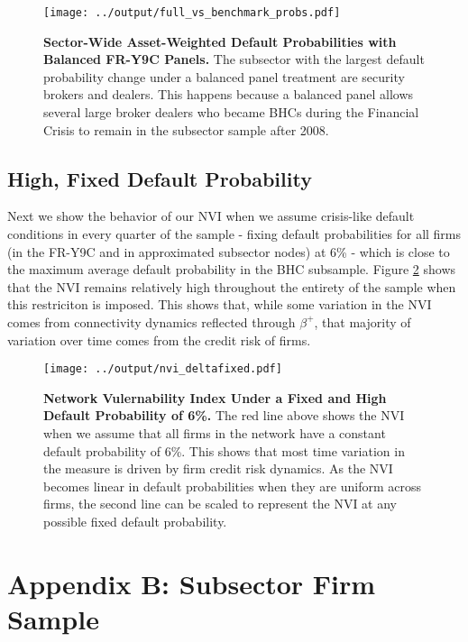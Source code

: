 \begin{figure}[H]
\begin{center}
\texttt{[image: ../output/full\_vs\_benchmark\_probs.pdf]}
\end{center}
\caption[]{\textbf{Sector-Wide Asset-Weighted Default Probabilities with Balanced FR-Y9C Panels.} The subsector with the largest default probability change under a balanced panel treatment are security brokers and dealers. This happens because a balanced panel allows several large broker dealers who became BHCs during the Financial Crisis to remain in the subsector sample after 2008.} \label{fig:default_prob_full}
\end{figure}

\subsection*{High, Fixed Default Probability}

Next we show the behavior of our NVI when we assume crisis-like default conditions in every quarter of the sample - fixing default probabilities for all firms (in the FR-Y9C and in approximated subsector nodes) at 6\% - which is close to the maximum average default probability in the BHC subsample. Figure \ref{fig:nvi_delta_fix} shows that the NVI remains relatively high throughout the entirety of the sample when this restriciton is imposed. This shows that, while some variation in the NVI comes from connectivity dynamics reflected through $\beta^+$, that majority of variation over time comes from the credit risk of firms. 

\begin{figure}[H]
\begin{center}
\texttt{[image: ../output/nvi\_deltafixed.pdf]}
\end{center}
\caption[]{\textbf{Network Vulernability Index Under a Fixed and High Default Probability of 6\%.} The red line above shows the NVI when we assume that all firms in the network have a constant default probability of 6\%. This shows that most time variation in the measure is driven by firm credit risk dynamics. As the NVI becomes linear in default probabilities when they are uniform across firms, the second line can be scaled to represent the NVI at any possible fixed default probability.}\label{fig:nvi_delta_fix}
\end{figure}

\section{Appendix B: Subsector Firm Sample} \label{sec:appendixb}

